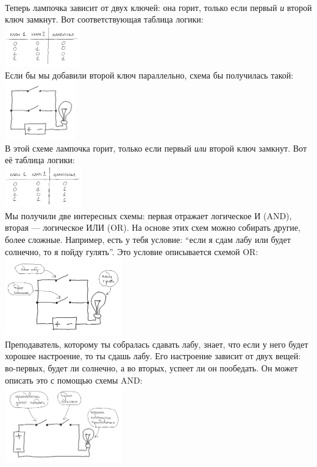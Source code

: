 \documentclass[11pt]{book}
\begin{document}
\\
Теперь лампочка зависит от двух ключей: она горит, только если первый
\emph{и} второй ключ замкнут. Вот соответствующая таблица логики:
\\
\includegraphics[height=0.7in]{pic/5.png}
\\
Если бы мы добавили второй ключ параллельно, схема бы получилась такой:
\\
\includegraphics[height=1in]{pic/6.png}
\\
В этой схеме лампочка горит, только если первый \emph{или} второй ключ замкнут.
Вот её таблица логики:
\\
\includegraphics[height=0.7in]{pic/7.png}
\\
Мы получили две интересных схемы: первая отражает логическое И (AND), вторая ---
логическое ИЛИ (OR). На основе этих схем можно собирать другие, более сложные.
Например, есть у тебя условие: ``если я сдам лабу или будет солнечно,
то я пойду гулять''. Это условие описывается схемой OR:
\\
\includegraphics[width=2in]{pic/8.png}
\\
Преподаватель, которому ты собралась сдавать лабу, знает, что если у него
будет хорошее настроение, то ты сдашь лабу. Его настроение зависит от двух вещей:
во-первых, будет ли солнечно, а во вторых, успеет ли он пообедать.
Он может описать это с помощью схемы AND:
\\
\includegraphics[width=2in]{pic/9.png}
\end{document}
